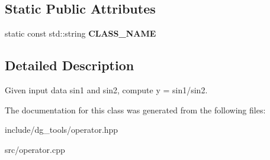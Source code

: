 \subsection*{Static Public Attributes}
\begin{DoxyCompactItemize}
\item 
static const std\+::string {\bfseries C\+L\+A\+S\+S\+\_\+\+N\+A\+ME}\hypertarget{classdg__tools_1_1Division__of__double_a7b3fe3072ec59d063568504cf7ff6481}{}\label{classdg__tools_1_1Division__of__double_a7b3fe3072ec59d063568504cf7ff6481}

\end{DoxyCompactItemize}


\subsection{Detailed Description}
Given input data sin1 and sin2, compute y = sin1/sin2. 

The documentation for this class was generated from the following files\+:\begin{DoxyCompactItemize}
\item 
include/dg\+\_\+tools/operator.\+hpp\item 
src/operator.\+cpp\end{DoxyCompactItemize}
